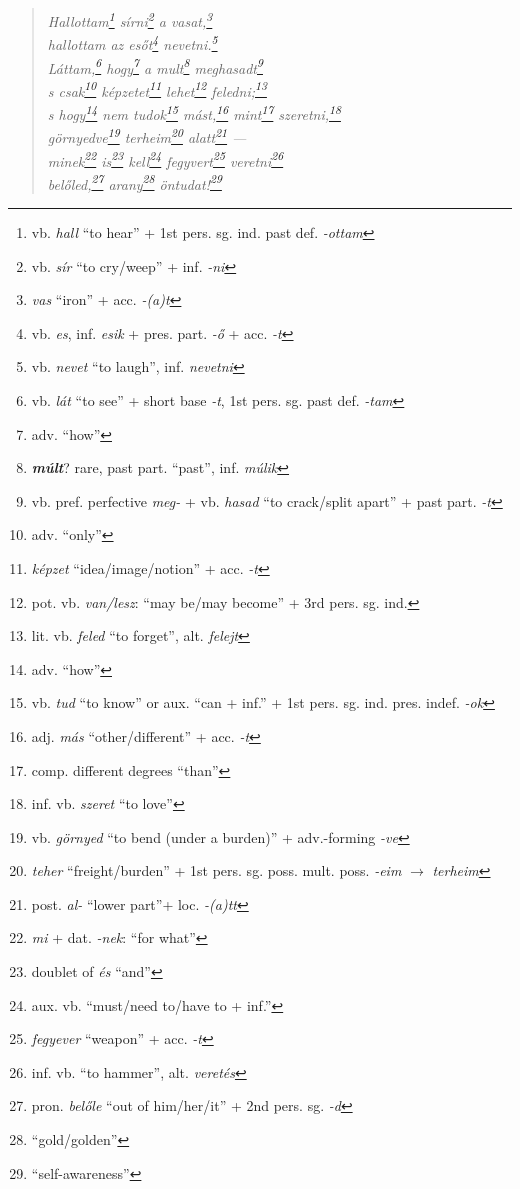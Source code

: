 \documentclass[a4paper,12pt,twoside,final]{book}
\begin{document}
\begin{verse}%
  \it
  Hallottam\footnote{vb. \emph{hall} ``to hear'' + 1st
  pers. sg. ind. past def. \emph{-ottam}} sírni\footnote{vb.
  \emph{sír} ``to cry/weep'' + inf. \emph{-ni}} a
  vasat,\footnote{\emph{vas} ``iron'' + acc. \emph{-(a)t}} \\
  hallottam az esőt\footnote{vb. \emph{es}, inf. \emph{esik} +
  pres. part. \emph{-ő} + acc. \emph{-t}} nevetni.\footnote{vb.
  \emph{nevet} ``to laugh'', inf. \emph{nevetni}} \\
  Láttam,\footnote{vb. \emph{lát} ``to see'' +
  short base \emph{-t}, 1st pers. sg. past def. \emph{-tam}}
  hogy\footnote{adv. ``how''} a mult\footnote{\textbf{\emph{múlt}}?
  rare, past part. ``past'', inf. \emph{múlik}}
  meghasadt\footnote{vb. pref. perfective \emph{meg-} + vb.
  \emph{hasad} ``to crack/split apart'' + past
  part. \emph{-t}} \\
  s csak\footnote{adv. ``only''} képzetet\footnote{\emph{képzet}
  ``idea/image/notion'' + acc. \emph{-t}}
  lehet\footnote{pot. vb. \emph{van/lesz}:
  ``may be/may become'' + 3rd pers. sg. ind.}
  feledni;\footnote{lit. vb. \emph{feled} ``to forget'', alt. \emph{felejt}} \\
  s hogy\footnote{adv. ``how''} nem tudok\footnote{vb.
  \emph{tud} ``to know'' or aux. ``can + inf.'' + 1st
  pers. sg. ind. pres. indef. \emph{-ok}}
  mást,\footnote{adj. \emph{más} ``other/different'' + acc. \emph{-t}}
  mint\footnote{comp. different degrees ``than''}
  szeretni,\footnote{inf. vb. \emph{szeret} ``to love''} \\
  görnyedve\footnote{vb. \emph{görnyed} ``to bend (under a
  burden)'' + adv.-forming \emph{-ve}} terheim\footnote{\emph{teher}
  ``freight/burden'' + 1st
  pers. sg. poss. mult. poss. \emph{-eim} $\rightarrow$ \emph{terheim}}
  alatt\footnote{post. \emph{al-} ``lower part''+ loc. \emph{-(a)tt}}
  --- \\
  minek\footnote{\emph{mi} + dat. \emph{-nek}: ``for what''}
  is\footnote{doublet of \emph{és} ``and''}
  kell\footnote{aux. vb. ``must/need to/have to + inf.''}
  fegyvert\footnote{\emph{fegyever} ``weapon'' + acc. \emph{-t}}
    veretni\footnote{inf. vb. ``to hammer'', alt. \emph{veretés}} \\
  belőled,\footnote{pron. \emph{belőle} ``out of him/her/it'' + 2nd
  pers. sg. \emph{-d}} arany\footnote{``gold/golden''}
  öntudat!\footnote{``self-awareness''}
\end{verse}
\end{document}
